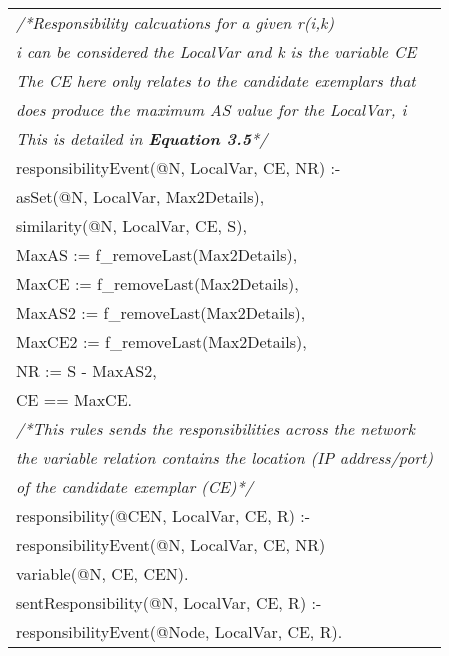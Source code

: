 \documentclass[letterpaper,twocolumn,11pt]{article}
\begin{document}
\begin{tabular}{|l|}
\scriptsize{\textit{/*Responsibility calcuations for a given r(i,k)}}\\
\scriptsize{\textit{i can be considered the LocalVar and k is the variable CE}}\\
\scriptsize{\textit{The CE here only relates to the candidate exemplars that}}\\
\scriptsize{\textit{does produce the maximum AS value for the LocalVar, i}}\\
\scriptsize{\textit{This is detailed in \textbf{Equation 3.5}*/}}\\
\scriptsize{responsibilityEvent(@N, LocalVar, CE, NR)  :-}\\
\scriptsize{ \hspace{0.5cm}        asSet(@N, LocalVar, Max2Details),}\\
\scriptsize{ \hspace{0.5cm}        similarity(@N, LocalVar, CE, S),}\\
\scriptsize{ \hspace{0.5cm}        MaxAS := f\_removeLast(Max2Details),}\\
\scriptsize{ \hspace{0.5cm}        MaxCE := f\_removeLast(Max2Details),}\\
\scriptsize{ \hspace{0.5cm}        MaxAS2 := f\_removeLast(Max2Details),}\\
\scriptsize{ \hspace{0.5cm}        MaxCE2 := f\_removeLast(Max2Details),}\\
\scriptsize{ \hspace{0.5cm}        NR := S - MaxAS2,}\\
\scriptsize{ \hspace{0.5cm}        CE == MaxCE.}\\

\scriptsize{\textit{/*This rules sends the responsibilities across the network}}\\
\scriptsize{\textit{the variable relation contains the location (IP address/port)}}\\
\scriptsize{\textit{of the candidate exemplar (CE)*/}}\\
\scriptsize{responsibility(@CEN, LocalVar, CE, R)  :-}\\
\scriptsize{ \hspace{0.5cm}        responsibilityEvent(@N, LocalVar, CE, NR)}\\
\scriptsize{ \hspace{0.5cm}        variable(@N, CE, CEN).}\\
        
\scriptsize{sentResponsibility(@N, LocalVar, CE, R)  :-}\\
\scriptsize{ \hspace{0.5cm}        responsibilityEvent(@Node, LocalVar, CE, R).}\\
\hline
\end{tabular}\\
\end{document}
